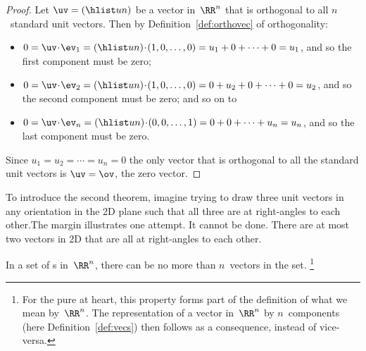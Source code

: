 \begin{proof} 
Let \(\uv=(\hlist un)\) be a vector in~\(\RR^n\) that is orthogonal to all \(n\)~standard unit vectors.  
Then by Definition~\ref{def:orthovec} of orthogonality:
\begin{itemize}
\item \(0=\uv\cdot\ev_1=(\hlist un)\cdot(1,0,\ldots,0)=u_1+0+\cdots+0=u_1\), and so the first component must be zero;
\item \(0=\uv\cdot\ev_2=(\hlist un)\cdot(1,0,\ldots,0)=0+u_2+0+\cdots+0=u_2\), and so the second component must be zero; and so on to
\item \(0=\uv\cdot\ev_n=(\hlist un)\cdot(0,0,\ldots,1)=0+0+\cdots+u_n=u_n\), and so the last component must be zero.
\end{itemize}
Since \(u_1=u_2=\cdots=u_n=0\) the only vector that is orthogonal to all the standard unit vectors is \(\uv=\ov\), the zero vector.
\end{proof}


To introduce the second theorem, 
%
imagine trying to draw three unit vectors in any orientation in the 2D plane such that all three are at right-angles to each other.The margin illustrates one attempt.
It cannot be done.
There are at most two vectors in 2D that are all at right-angles to each other.


\begin{theorem} \label{thm:orthcomp}
In a set of  s in~\(\RR^n\), there can be no more than \(n\)~vectors in the set.
\footnote{For the pure at heart, this property forms part of the definition of what we mean by~\(\RR^n\).  
The representation of a vector in~\(\RR^n\) by \(n\)~components (here Definition~\ref{def:vecs}) then follows as a consequence, instead of vice-versa.}
\end{theorem}


